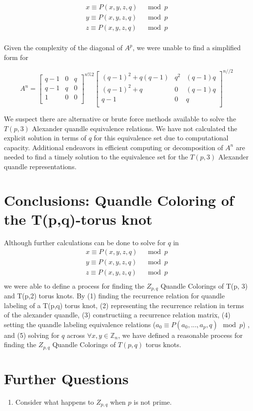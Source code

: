 \documentclass[paper.tex]{subfiles}
\begin{document}
\begin{align*}
	x \equiv P(x,y,z,q) & \mod{p} \\
	y \equiv P(x,y,z,q) & \mod{p} \\
	z \equiv P(x,y,z,q) & \mod{p} \\
\end{align*}

Given the complexity of the diagonal of $A^{p}$, we were unable to find a simplified form for 

\[ A^{n}
=
\left[ \begin{array}{ccc}
q-1 & 0 & q \\
q-1 & q & 0 \\
1 & 0 & 0 \\
\end{array} \right] ^{n\%2}
\left[ \begin{array}{ccc}
(q-1)^{2} + q(q-1) & q^{2} & (q-1)q \\
(q-1)^{2} + q & 0 & (q-1)q \\
q-1 & 0 & q \\
\end{array} \right] ^{n//2} 
\]

We suspect there are alternative or brute force methods available to solve the $T(p,3)$ Alexander quandle equivalence relations.  We have not calculated the explicit solution in terms of $q$ for this equivalence set due to computational capacity. Additional endeavors in efficient computing or decomposition of $A^{n}$ are needed to find a timely solution to the equivalence set for the $T(p,3)$ Alexander quandle representations. 

\section{Conclusions: Quandle Coloring of the T(p,q)-torus knot}\label{sec:2ntorus}
Although further calculations can be done to solve for $q$ in 
\begin{align*}
	x \equiv P(x,y,z,q) & \mod{p} \\
	y \equiv P(x,y,z,q) & \mod{p} \\
	z \equiv P(x,y,z,q) & \mod{p} \\
\end{align*}
we were able to define a process for finding the $Z_{p,q}$ Quandle Colorings of T(p, 3) and T(p,2) torus knots. By (1) finding the recurrence relation for quandle labeling of a T(p,q) torus knot, (2) representing the recurrence relation in terms of the alexander quandle, (3) constructiing a recurrence relation matrix,  (4) setting the quandle labeling equivalence relations ($a_{0} \equiv P(a_{0},...,a_{p},q) \mod{p}$) , and (5) solving for $q$ across $\forall x,y \in \mathbb{Z}_n$, we have defined a reasonable process for finding the $Z_{p,q}$ Quandle Colorings of $T(p,q)$ torus knots. 

\section{Further Questions}\label{fqs}

\begin{enumerate}
	\item Consider what happens to $Z_{p,q}$ when $p$ is not prime.
\end{enumerate}



\end{document}
